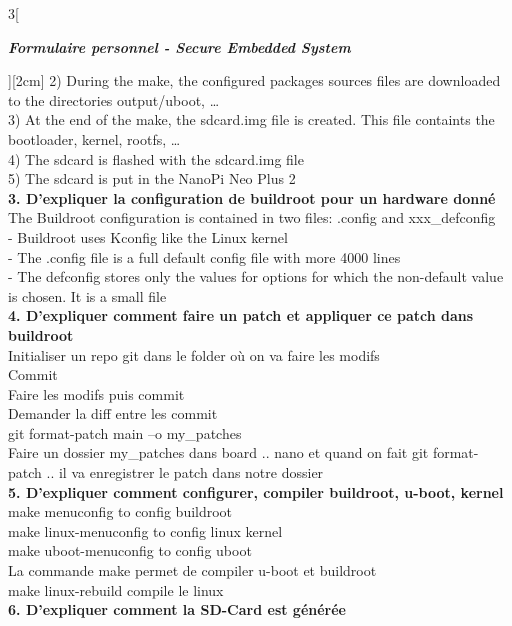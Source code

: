 \begin{multicols}{3}[\centerline{ \large\em \textbf{Formulaire personnel - Secure Embedded System}}][2cm]
2) During the make, the configured packages sources files are downloaded to the
directories output/uboot, …\\
3) At the end of the make, the sdcard.img file is created. This file containts the bootloader, kernel, rootfs, …\\
4) The sdcard is flashed with the sdcard.img file\\
5) The sdcard is put in the NanoPi Neo Plus 2 \\
\textbf{3. D’expliquer la configuration de buildroot pour un hardware donné\\}
The Buildroot configuration is contained in two files: .config and xxx\_defconfig\\
- Buildroot uses Kconfig like the Linux kernel\\
- The .config file is a full default config file with more 4000 lines\\
- The defconfig stores only the values for options for which the non-default value is chosen. It is a small file 
\\ \textbf{4. D’expliquer comment faire un patch et appliquer ce patch dans buildroot\\}
Initialiser un repo git dans le folder où on va faire les modifs\\
Commit\\
Faire les modifs puis commit\\
Demander la diff entre les commit\\
git format-patch main –o my\_patches\\
Faire un dossier my\_patches dans board .. nano et quand on fait git format-patch .. il va enregistrer le patch dans notre dossier
\\ \textbf{5. D’expliquer comment configurer, compiler buildroot, u-boot, kernel\\}
make menuconfig to config buildroot\\
make linux-menuconfig to config linux kernel\\
make uboot-menuconfig to config uboot\\
La commande make permet de compiler u-boot et buildroot\\
make linux-rebuild compile le linux
\\
\textbf{6. D’expliquer comment la SD-Card est générée\\}
\begin{minipage}{\linewidth}
	\centering

\end{minipage}
\end{multicols}
